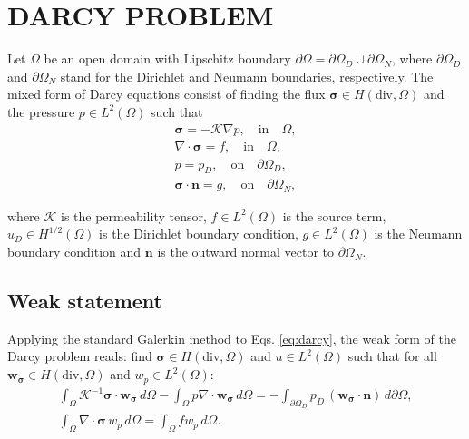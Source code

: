 \documentclass{wccm2024}
\begin{document}
\section{DARCY PROBLEM}

Let $\Omega$ be an open domain with Lipschitz boundary $\partial \Omega = \partial\Omega_D \cup \partial\Omega_N$, where $\partial\Omega_D$ and $\partial\Omega_N$ stand for the Dirichlet and Neumann boundaries, respectively. The mixed form of Darcy equations consist of finding the flux $\boldsymbol{\sigma} \in H(\text{div},\Omega)$ and the pressure $p \in L^2(\Omega)$ such that
\vskip -0.3cm
\begin{equation} \label{eq:darcy}
    \begin{split}
        \boldsymbol{\sigma}= -\mathcal{K}\nabla p, \quad \text{in} \quad \Omega, \\
        \nabla \cdot \boldsymbol{\sigma} = f, \quad \text{in} \quad \Omega, \\
        p = p_D, \quad \text{on} \quad \partial\Omega_D, \\
        \boldsymbol{\sigma} \cdot \boldsymbol{n} = g, \quad \text{on} \quad \partial\Omega_N,
    \end{split}
\end{equation}

\noindent where $\mathcal{K}$ is the permeability tensor, $f \in L^2(\Omega)$ is the source term, $u_D \in H^{1/2}(\Omega)$ is the Dirichlet boundary condition, $g \in L^2(\Omega)$ is the Neumann boundary condition and $\mathbf{n}$ is the outward normal vector to $\partial\Omega_N$.

\subsection{Weak statement}

Applying the standard Galerkin method to Eqs. \eqref{eq:darcy}, the weak form of the Darcy problem reads: find $\boldsymbol{\sigma} \in H(\text{div},\Omega)$ and $u \in L^2(\Omega)$ such that for all $\mathbf{w}_{\boldsymbol{\sigma}} \in H(\text{div},\Omega)$ and $w_p \in L^2(\Omega)$:
\vskip -0.3cm
\begin{equation} \label{eq:weak}
    \begin{split}
        \int_{\Omega} \mathcal{K}^{-1}\boldsymbol{\sigma} \cdot \mathbf{w}_{\boldsymbol{\sigma}} \, d\Omega - \int_{\Omega} p \nabla \cdot \mathbf{w}_{\boldsymbol{\sigma}} \, d\Omega = - \int_{\partial\Omega_D} p_D \, ( \mathbf{w}_{\boldsymbol{\sigma}} \cdot \mathbf{n}) \, d\partial\Omega, \\
        \int_{\Omega} \nabla \cdot \boldsymbol{\sigma} \,w_p \, d\Omega = \int_{\Omega} f w_p \, d\Omega.
    \end{split}
\end{equation}
\end{document}

